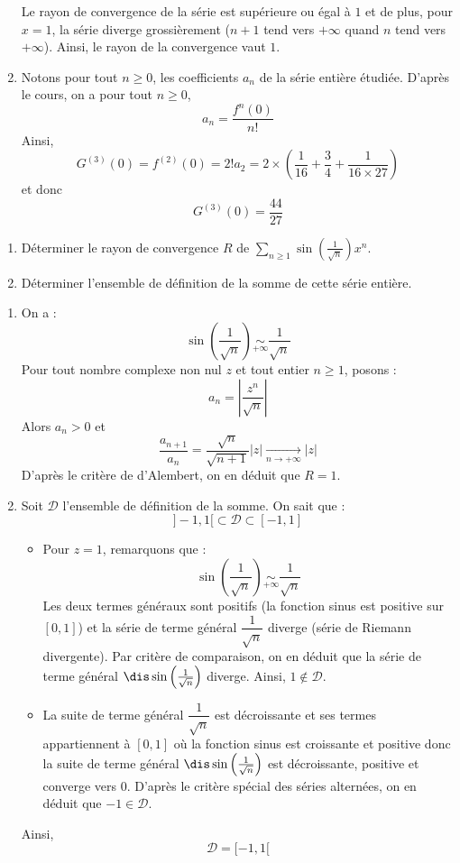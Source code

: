 \documentclass[a4paper,10pt]{report}
\newcommand{\Sum}[2]{\ensuremath{\textstyle{\sum\limits_{#1}^{#2}}}}
\begin{document}
\begin{enumerate}
Le rayon de convergence de la série est supérieure ou égal à $1$ et de plus, pour $x=1$, la série diverge grossièrement ($n+1$ tend vers $+ \infty$ quand $n$ tend vers $+ \infty$). Ainsi, le rayon de la convergence vaut $1$.
\item Notons pour tout $n \geq 0$, les coefficients $a_n$ de la série entière étudiée.  D'après le cours, on a pour tout $n \geq 0$,
$$ a_n = \dfrac{f^n(0)}{n!}$$
Ainsi,
$$G^{(3)}(0)=f^{(2)}(0)=2!a_2=2\times\left(\dfrac{1}{16} +\dfrac{3}{4}+\dfrac{1}{16\times 27}\right)$$
et donc
$$ G^{(3)}(0)=\dfrac{44}{27}$$
\end{enumerate}

\begin{Exa} \begin{enumerate}
\item Déterminer le rayon de convergence $R$ de $\Sum{n \geq 1}{} \sin \left( \frac{1}{\sqrt{n}} \right) x^n$.
\item Déterminer l'ensemble de définition de la somme de cette série entière.
\end{enumerate}
\end{Exa}

\corr 

\begin{enumerate}
\item On a :
$$ \sin \left( \frac{1}{\sqrt{n}} \right) \underset{+ \infty}{\sim} \dfrac{1}{\sqrt{n}}$$
Pour tout nombre complexe non nul $z$ et tout entier $n \geq 1$, posons :
$$  a_n = \left\vert \dfrac{z^n}{ \sqrt{n}} \right\vert$$
Alors $a_n>0$ et 
$$ \dfrac{a_{n+1}}{a_n} = \dfrac{\sqrt{n}}{\sqrt{n+1}} \vert z \vert \underset{ n \rightarrow+ \infty}{\longrightarrow} \vert z \vert$$
D'après le critère de d'Alembert, on en déduit que $R=1$.
\item Soit $\mathcal{D}$ l'ensemble de définition de la somme. On sait que : 
$$ ]-1,1[ \subset \mathcal{D} \subset [-1,1]$$
\begin{itemize}
\item Pour $z=1$, remarquons que :
$$ \sin \left( \frac{1}{\sqrt{n}} \right) \underset{+ \infty}{\sim} \dfrac{1}{\sqrt{n}} $$
Les deux termes généraux sont positifs (la fonction sinus est positive sur $[0,1]$) et la série de terme général $\dfrac{1}{\sqrt{n}}$ diverge (série de Riemann divergente). Par critère de comparaison, on en déduit que la série de terme général $\dis \sin \left( \frac{1}{\sqrt{n}} \right)$ diverge. Ainsi, $1 \notin \mathcal{D}$.
\item La suite de terme général $\dfrac{1}{\sqrt{n}}$ est décroissante et ses termes appartiennent à $[0,1]$ où la fonction sinus est croissante et positive donc la suite de terme général $\dis \sin \left( \frac{1}{\sqrt{n}} \right)$ est décroissante, positive et converge vers $0$. D'après le critère spécial des séries alternées, on en déduit que $-1 \in \mathcal{D}$.
\end{itemize}
Ainsi,
$$ \mathcal{D}= [-1,1[$$
\end{enumerate}
\end{document}
